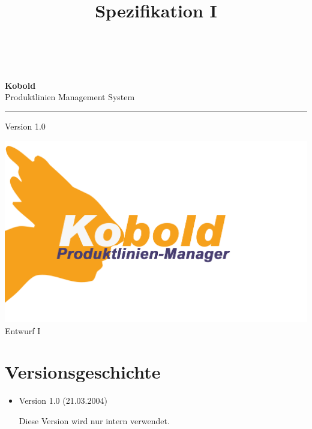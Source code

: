 \documentclass[a4paper,titlepage,12pt,ngerman]{scrbook}
\title {\huge \product\\[0.5cm]\large Spezifikation I \\[0.5cm] \version
  \\[1cm] \Large \company}
\newcommand\version{Version 1.0\xspace}
\begin{document}

\begin{titlepage}
\renewcommand{\thefootnote}{\fnsymbol{footnote}}
{\Huge
\raggedright
\textbf{\bf Kobold} \\
\huge Produktlinien Management System
\rule{\textwidth}{0.75pt}
\par
}
\begin{flushleft}
\normalsize
\version
\end{flushleft}


\vfill
\includegraphics[width=15cm]{../common/logo-color.png}
\vfill
{\parindent=0cm
\Huge Entwurf I
}


\setcounter{footnote}{0}
\end{titlepage}


\section*{Versionsgeschichte}

\begin{itemize}

\item Version 1.0 (21.03.2004)
    
    Diese Version wird nur intern verwendet.

\end{itemize}

\tableofcontents











\appendix

\end{document}
